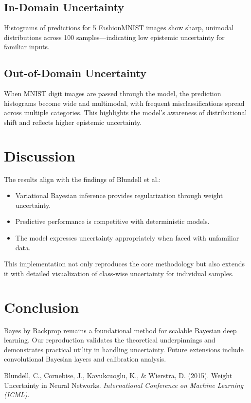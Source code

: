 \documentclass{article}
\begin{document}
\subsection{In-Domain Uncertainty}

Histograms of predictions for 5 FashionMNIST images show sharp, unimodal distributions across 100 samples—indicating low epistemic uncertainty for familiar inputs.

\subsection{Out-of-Domain Uncertainty}

When MNIST digit images are passed through the model, the prediction histograms become wide and multimodal, with frequent misclassifications spread across multiple categories. This highlights the model’s awareness of distributional shift and reflects higher epistemic uncertainty.

\section{Discussion}

The results align with the findings of Blundell et al.:
\begin{itemize}
    \item Variational Bayesian inference provides regularization through weight uncertainty.
    \item Predictive performance is competitive with deterministic models.
    \item The model expresses uncertainty appropriately when faced with unfamiliar data.
\end{itemize}

This implementation not only reproduces the core methodology but also extends it with detailed visualization of class-wise uncertainty for individual samples.

\section{Conclusion}

Bayes by Backprop remains a foundational method for scalable Bayesian deep learning. Our reproduction validates the theoretical underpinnings and demonstrates practical utility in handling uncertainty. Future extensions include convolutional Bayesian layers and calibration analysis.


\begin{thebibliography}{9}
Blundell, C., Cornebise, J., Kavukcuoglu, K., \& Wierstra, D. (2015). Weight Uncertainty in Neural Networks. \textit{International Conference on Machine Learning (ICML)}.
\end{thebibliography}
\end{document}
